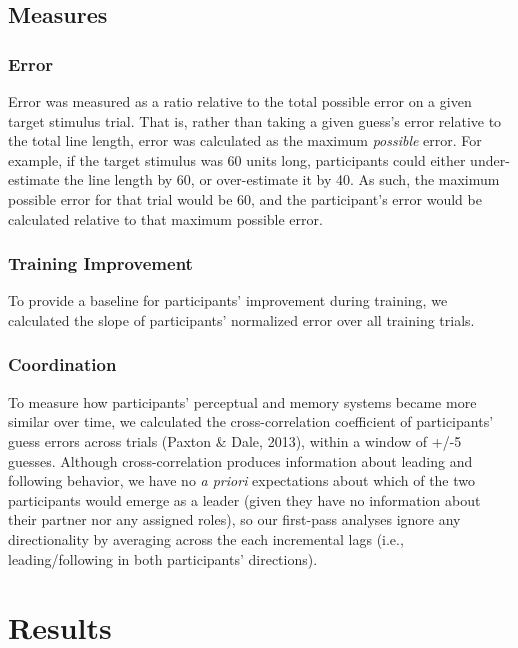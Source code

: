 \documentclass[10pt, letterpaper]{article}
\begin{document}
\subsection{Measures}\label{measures}

\subsubsection{Error}\label{error}

Error was measured as a ratio relative to the total possible error on a
given target stimulus trial. That is, rather than taking a given guess's
error relative to the total line length, error was calculated as the
maximum \emph{possible} error. For example, if the target stimulus was
60 units long, participants could either under-estimate the line length
by 60, or over-estimate it by 40. As such, the maximum possible error
for that trial would be 60, and the participant's error would be
calculated relative to that maximum possible error.

\subsubsection{Training Improvement}\label{training-improvement}

To provide a baseline for participants' improvement during training, we
calculated the slope of participants' normalized error over all training
trials.

\subsubsection{Coordination}\label{coordination}

To measure how participants' perceptual and memory systems became more
similar over time, we calculated the cross-correlation coefficient of
participants' guess errors across trials (Paxton \& Dale, 2013), within
a window of +/-5 guesses. Although cross-correlation produces
information about leading and following behavior, we have no \emph{a
priori} expectations about which of the two participants would emerge as
a leader (given they have no information about their partner nor any
assigned roles), so our first-pass analyses ignore any directionality by
averaging across the each incremental lags (i.e., leading/following in
both participants' directions).

\section{Results}\label{results}
\end{document}
